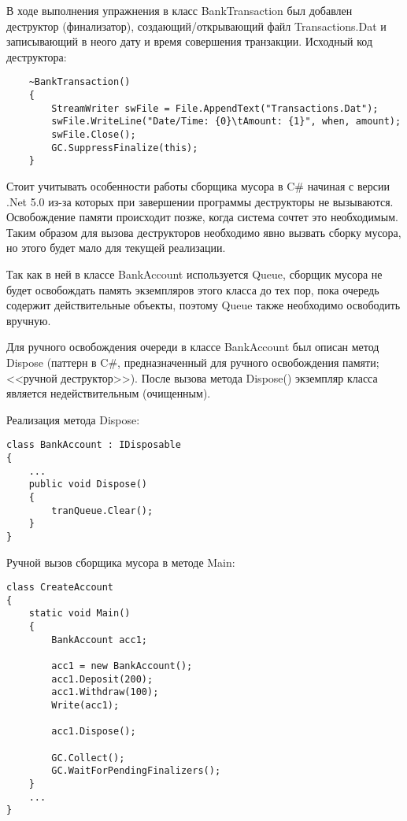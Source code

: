     В ходе выполнения упражнения в класс BankTransaction был добавлен деструктор (финализатор), создающий/открывающий файл Transactions.Dat и записывающий в неого дату и время совершения транзакции.
    Исходный код деструктора:
\begingroup
\fontsize{12pt}{12pt}\selectfont
\linespread{1.5}
\begin{verbatim}
    ~BankTransaction()
    {
        StreamWriter swFile = File.AppendText("Transactions.Dat");
        swFile.WriteLine("Date/Time: {0}\tAmount: {1}", when, amount);
        swFile.Close();
        GC.SuppressFinalize(this);
    }
\end{verbatim}  
\endgroup
    
    Стоит учитывать особенности работы сборщика мусора в C\# начиная с версии .Net 5.0 из-за которых при завершении программы деструкторы не вызываются. Освобождение памяти происходит позже, когда система сочтет это необходимым.
    Таким образом для вызова деструкторов необходимо явно вызвать сборку мусора, но этого будет мало для текущей реализации. 

    Так как в ней в классе BankAccount используется Queue, сборщик мусора не будет освобождать память экземпляров этого класса до тех пор, пока очередь содержит действительные объекты, поэтому Queue также необходимо освободить вручную.

    Для ручного освобождения очереди в классе BankAccount был описан метод Dispose (паттерн в C\#, предназначенный для ручного освобождения памяти; <<ручной деструктор>>).
    После вызова метода Dispose() экземпляр класса является недействительным (очищенным).

    Реализация метода Dispose:

\begingroup
\fontsize{12pt}{12pt}\selectfont
\linespread{1.5}
\begin{verbatim}
class BankAccount : IDisposable
{
    ...
    public void Dispose()
    {
        tranQueue.Clear();
    }
}
\end{verbatim}  
\endgroup

    Ручной вызов сборщика мусора в методе Main:

\begingroup
\fontsize{12pt}{12pt}\selectfont
\linespread{1.5}
\begin{verbatim}
class CreateAccount
{
    static void Main() 
    {
        BankAccount acc1;

        acc1 = new BankAccount();
        acc1.Deposit(200);
        acc1.Withdraw(100);
        Write(acc1);

        acc1.Dispose();

        GC.Collect();
        GC.WaitForPendingFinalizers();
    }
    ...
}
\end{verbatim}  
\endgroup


